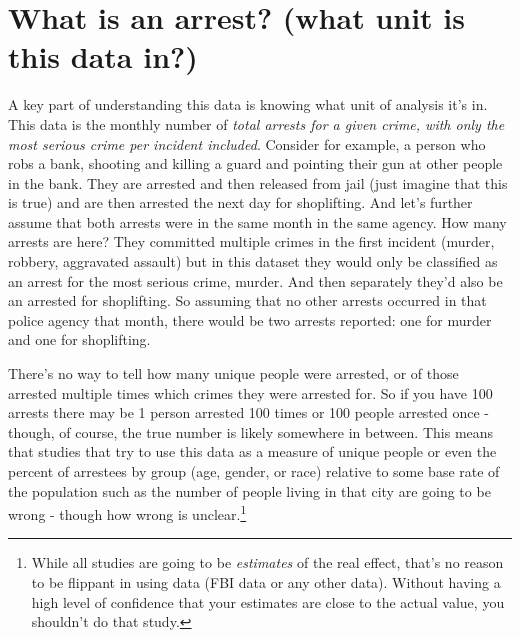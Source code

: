 \documentclass[
]{krantz}
\begin{document}
\section{What is an arrest? (what unit is this data
in?)}\label{what-is-an-arrest-what-unit-is-this-data-in}

A key part of understanding this data is knowing what unit
of analysis it's in. This data is the monthly number of
\emph{total arrests for a given crime, with only the most
serious crime per incident included}. Consider for example,
a person who robs a bank, shooting and killing a guard and
pointing their gun at other people in the bank. They are
arrested and then released from jail (just imagine that this
is true) and are then arrested the next day for shoplifting.
And let's further assume that both arrests were in the same
month in the same agency. How many arrests are here? They
committed multiple crimes in the first incident (murder,
robbery, aggravated assault) but in this dataset they would
only be classified as an arrest for the most serious crime,
murder. And then separately they'd also be an arrested for
shoplifting. So assuming that no other arrests occurred in
that police agency that month, there would be two arrests
reported: one for murder and one for shoplifting.

There's no way to tell how many unique people were arrested,
or of those arrested multiple times which crimes they were
arrested for. So if you have 100 arrests there may be 1
person arrested 100 times or 100 people arrested once -
though, of course, the true number is likely somewhere in
between. This means that studies that try to use this data
as a measure of unique people or even the percent of
arrestees by group (age, gender, or race) relative to some
base rate of the population such as the number of people
living in that city are going to be wrong - though how wrong
is unclear.\footnote{While all studies are going to be
  \emph{estimates} of the real effect, that's no reason to
  be flippant in using data (FBI data or any other data).
  Without having a high level of confidence that your
  estimates are close to the actual value, you shouldn't do
  that study.}
\end{document}
